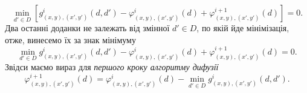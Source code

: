 \begin{equation*}
    \min \limits_{d' \in D} \left[
        g_{\left(x, y \right), \left(x', y' \right)}^{i} \left( d, d' \right) -
        \varphi_{\left(x, y \right), \left(x', y' \right)}^{i} \left( d \right) +
        \varphi_{\left(x, y \right), \left(x', y' \right)}^{i + 1} \left( d \right)
    \right] = 0.
\end{equation*}
Два останні доданки не залежать від змінної $d' \in D$, по якій йде мінімізація,
отже, винесемо їх за знак мінімуму
\begin{equation*}
    \min \limits_{d' \in D}
        g_{\left(x, y \right), \left(x', y' \right)}^{i} \left( d, d' \right) -
    \varphi_{\left(x, y \right), \left(x', y' \right)}^{i} \left( d \right) +
    \varphi_{\left(x, y \right), \left(x', y' \right)}^{i + 1} \left( d \right) =
    0.
\end{equation*}
Звідси маємо вираз для \textit{першого кроку алгоритму дифузії}
\begin{equation*}
    \varphi_{\left(x, y \right), \left(x', y' \right)}^{i + 1} \left( d \right) =
    \varphi_{\left(x, y \right), \left(x', y' \right)}^{i} \left( d \right) -
    \min \limits_{d' \in D}
        g_{\left(x, y \right), \left(x', y' \right)}^{i} \left( d, d' \right).
\end{equation*}


